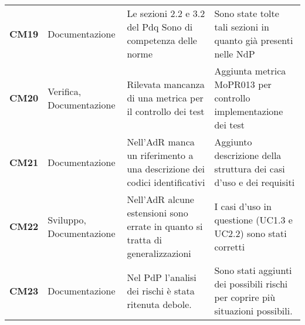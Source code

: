 \documentclass[../piano-di-qualifica.tex]{subfiles}
\begin{document}
\begin{longtable}[H]{>{\centering\bfseries}m{2.5cm} >{\centering}m{2.5cm} >{\centering}m{5.5cm} >{\centering\arraybackslash}m{5.5cm}}
CM19 & Documentazione                                & Le sezioni 2.2 e 3.2 del Pdq Sono di competenza delle norme                                                                                                                   & Sono state tolte tali sezioni in quanto già presenti nelle NdP                                                                                                                                                                                                                                                                                      \\
CM20 & Verifica, Documentazione                      & Rilevata mancanza di una metrica per il controllo dei test                                                                                                                    & Aggiunta metrica MoPR013 per controllo implementazione dei test                                                                                                                                                                                                                                                                                     \\
CM21 & Documentazione                                & Nell’AdR manca un riferimento a una descrizione dei codici identificativi                                                                                                     & Aggiunto descrizione della struttura dei casi d’uso e dei requisiti                                                                                                                                                                                                                                                                                 \\
CM22 & Sviluppo, Documentazione                      & Nell’AdR alcune estensioni sono errate in quanto si tratta di generalizzazioni                                                                                                & I casi d’uso in questione (UC1.3 e UC2.2) sono stati corretti                                                                                                                                                                                                                                                                                       \\
CM23 & Documentazione                                & Nel PdP l’analisi dei rischi è stata ritenuta debole.                                                                                                                         & Sono stati aggiunti dei possibili rischi per coprire più situazioni possibili.                                                                                                                                                                                                                                                                      \\

\end{longtable}
\end{document}
